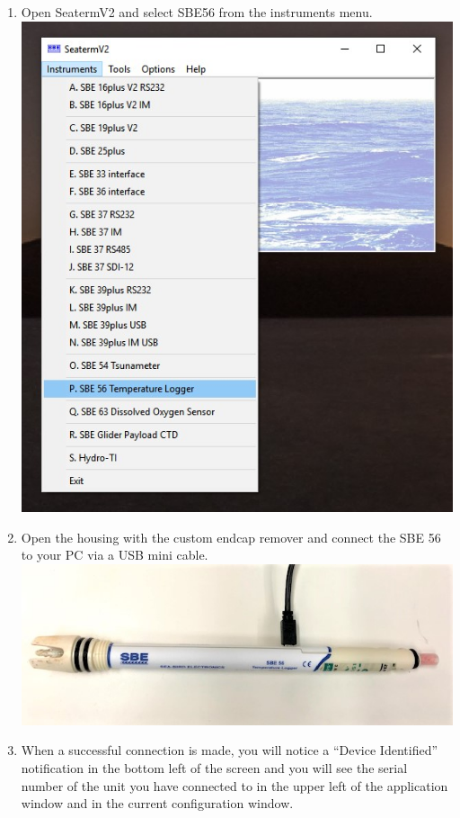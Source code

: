\documentclass[
]{book}
\providecommand{\tightlist}{%
  \setlength{\itemsep}{0pt}\setlength{\parskip}{0pt}}
\begin{document}
\begin{enumerate}
\def\labelenumi{\arabic{enumi}.}
\tightlist
\item
  Open SeatermV2 and select SBE56 from the instruments menu.
  \includegraphics{images/SBE56_program_step_1.jpg}
\item
  Open the housing with the custom endcap remover and connect the SBE 56 to your PC via a USB mini cable.
  \includegraphics{images/SBE56_connect.jpg}
\item
  When a successful connection is made, you will notice a ``Device Identified'' notification in the bottom left of the screen and you will see the serial number of the unit you have connected to in the upper left of the application window and in the current configuration window.

\end{enumerate}
\end{document}
